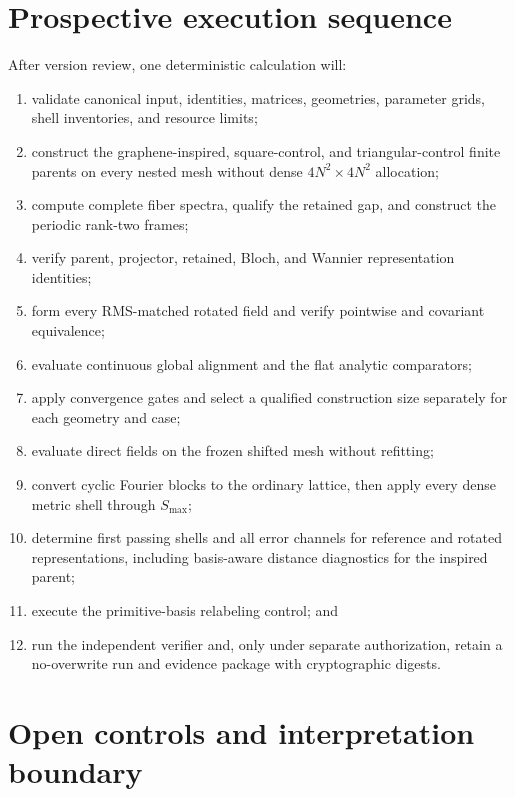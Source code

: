 \documentclass[11pt]{article}
\begin{document}
\section{Prospective execution sequence}

After version review, one deterministic calculation will:
\begin{enumerate}[label=\arabic*.]
 \item validate canonical input, identities, matrices, geometries, parameter grids,
       shell inventories, and resource limits;
 \item construct the graphene-inspired, square-control, and triangular-control finite
       parents on every nested mesh without dense $4N^2\times4N^2$ allocation;
 \item compute complete fiber spectra, qualify the retained gap, and construct the
       periodic rank-two frames;
 \item verify parent, projector, retained, Bloch, and Wannier representation identities;
 \item form every RMS-matched rotated field and verify pointwise and covariant
       equivalence;
 \item evaluate continuous global alignment and the flat analytic comparators;
 \item apply convergence gates and select a qualified construction size separately for
       each geometry and case;
 \item evaluate direct fields on the frozen shifted mesh without refitting;
 \item convert cyclic Fourier blocks to the ordinary lattice, then apply every dense
       metric shell through $S_{\max}$;
 \item determine first passing shells and all error channels for reference and rotated
       representations, including basis-aware distance diagnostics for the inspired
       parent;
 \item execute the primitive-basis relabeling control; and
 \item run the independent verifier and, only under separate authorization, retain a
       no-overwrite run and evidence package with cryptographic digests.
\end{enumerate}

\section{Open controls and interpretation boundary}
\end{document}
